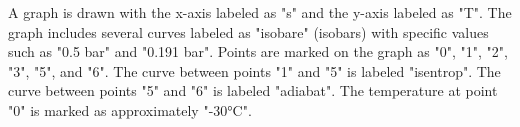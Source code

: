 A graph is drawn with the x-axis labeled as "s" and the y-axis labeled as "T". The graph includes several curves labeled as "isobare" (isobars) with specific values such as "0.5 bar" and "0.191 bar". Points are marked on the graph as "0", "1", "2", "3", "5", and "6". The curve between points "1" and "5" is labeled "isentrop". The curve between points "5" and "6" is labeled "adiabat". The temperature at point "0" is marked as approximately "-30°C".